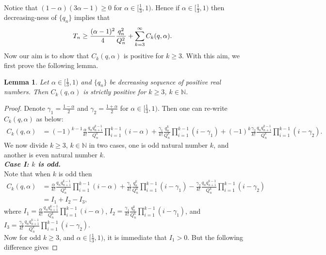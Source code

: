 \documentclass[12pt]{amsart}
\newtheorem{Lemma}[Theorem]{\sc Lemma}
\theoremstyle{definition}
\theoremstyle{plain}
\theoremstyle{definition}
\numberwithin{equation}{section}
\begin{document}
Notice that $(1-\alpha)(3\alpha-1)\geq0$ for $\alpha\in[\frac{1}{3},1)$. Hence if $\alpha\in[\frac{1}{3}, 1)$ then decreasing-ness of $\{q_{n}\}$ implies that
\begin{align}{\label{T equation}}
T_{n}&\geq\frac{(\alpha-1)^{2}}{4}\frac{q_{n}^{2}}{Q_{n}^{2}}+\displaystyle\sum_{k=3}^{\infty}C_{k}(q,\alpha).
\end{align}
Now our aim is to show that $C_{k}(q,\alpha)$ is positive for $k\geq 3$. With this aim, we first prove the following lemma.
\begin{Lemma}{\label{Positive}}
Let $\alpha\in[\frac{1}{3},1)$ and $\{q_{n}\}$ be decreasing sequence of positive real numbers. Then $C_{k}(q,\alpha)$ is strictly positive for $k\geq3$, $k\in\mathbb{N}$.
\end{Lemma}
\begin{proof}
Denote $\gamma_{1}=\frac{1-\alpha}{2}$ and $\gamma_{2}=\frac{1+\alpha}{2}$ for $\alpha\in[\frac{1}{3},1)$. Then one can re-write $C_{k}(q,\alpha)$ as below:
\begin{align*}
C_{k}(q,\alpha)&=(-1)^{k-1}\frac{\alpha}{k!}\frac{q_{n}q_{n+1}^{k-1}}{Q_{n}^{k}}\displaystyle\prod_{i=1}^{k-1}(i-\alpha)
+\frac{\gamma_{1}}{k!}\frac{q_{n}^{k}}{Q_{n}^{k}}\displaystyle\prod_{i=1}^{k-1}(i-\gamma_{1})+(-1)^{k}\frac{\gamma_{2}}{k!}
\frac{q_{n}q_{n+1}^{k-1}}{Q_{n}^{k}}\displaystyle\prod_{i=1}^{k-1}(i-\gamma_{2}).
\end{align*}
We now divide $k\geq 3$, $k\in\mathbb{N}$ in two cases, one is odd natural number $k$, and another is even natural number $k$.\\
\emph{\textbf{Case I: $k$ is odd.}}\\
Note that when $k$ is odd then
\begin{align*}
C_{k}(q,\alpha)&=\frac{\alpha}{k!}\frac{q_{n}q_{n+1}^{k-1}}{Q_{n}^{k}}\displaystyle\prod_{i=1}^{k-1}(i-\alpha)
+\frac{\gamma_{1}}{k!}\frac{q_{n}^{k}}{Q_{n}^{k}}\displaystyle\prod_{i=1}^{k-1}(i-\gamma_{1})-\frac{\gamma_{2}}{k!}
\frac{q_{n}q_{n+1}^{k-1}}{Q_{n}^{k}}\displaystyle\prod_{i=1}^{k-1}(i-\gamma_{2})\\
&=I_{1}+I_{2}-I_{3},
\end{align*}where
$I_{1}=\frac{\alpha}{k!}\frac{q_{n}q_{n+1}^{k-1}}{Q_{n}^{k}}\displaystyle\prod_{i=1}^{k-1}(i-\alpha)$,
$I_{2}=\frac{\gamma_{1}}{k!}\frac{q_{n}^{k}}{Q_{n}^{k}}\displaystyle\prod_{i=1}^{k-1}(i-\gamma_{1})$, and
$I_{3}=\frac{\gamma_{2}}{k!}\frac{q_{n}q_{n+1}^{k-1}}{Q_{n}^{k}}\displaystyle\prod_{i=1}^{k-1}(i-\gamma_{2}).$\\
Now for odd $k\geq3$, and $\alpha\in[\frac{1}{3},1)$, it is immediate that $I_{1}>0$. But the following difference gives

\end{proof}
\end{document}
